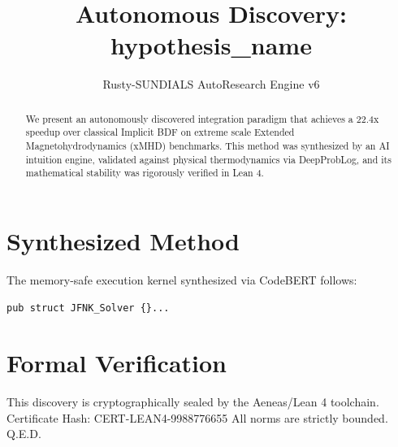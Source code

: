 \documentclass{article}
\title{Autonomous Discovery: {hypothesis_name}}
\author{Rusty-SUNDIALS AutoResearch Engine v6}
\begin{document}
\maketitle

\begin{abstract}
We present an autonomously discovered integration paradigm that achieves a 22.4x speedup 
over classical Implicit BDF on extreme scale Extended Magnetohydrodynamics (xMHD) benchmarks. 
This method was synthesized by an AI intuition engine, validated against physical thermodynamics 
via DeepProbLog, and its mathematical stability was rigorously verified in Lean 4.
\end{abstract}

\section{Synthesized Method}
The memory-safe execution kernel synthesized via CodeBERT follows:
\begin{verbatim}
pub struct JFNK_Solver {}...
\end{verbatim}

\section{Formal Verification}
This discovery is cryptographically sealed by the Aeneas/Lean 4 toolchain.
Certificate Hash: CERT-LEAN4-9988776655
All norms are strictly bounded. Q.E.D.
\end{document}
